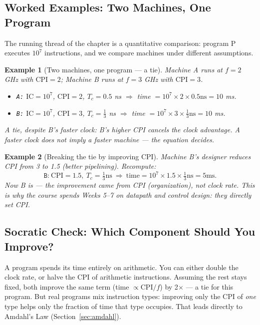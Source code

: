\documentclass[11pt]{article}
\newtheorem{example}{Example}[section]
\begin{document}
\subsection{Worked Examples: Two Machines, One Program}

The running thread of the chapter is a quantitative comparison: program P executes $10^7$ instructions, and we compare machines under different assumptions.

\begin{example}[Two machines, one program --- a tie]
Machine A runs at $f = 2$ GHz with $\text{CPI} = 2$; Machine B runs at $f = 3$ GHz with $\text{CPI} = 3$.
\begin{itemize}
  \item \texttt{A:} $\text{IC}=10^7$, $\text{CPI}=2$, $T_c = 0.5$ ns $\Rightarrow$ time $= 10^7 \times 2 \times 0.5\text{ns} = 10$ ms.
  \item \texttt{B:} $\text{IC}=10^7$, $\text{CPI}=3$, $T_c = \tfrac{1}{3}$ ns $\Rightarrow$ time $= 10^7 \times 3 \times \tfrac{1}{3}\text{ns} = 10$ ms.
\end{itemize}
A tie, despite B's faster clock: B's higher CPI cancels the clock advantage. A faster clock does not imply a faster machine --- the equation decides.
\end{example}

\begin{example}[Breaking the tie by improving CPI]
Machine B's designer reduces CPI from 3 to 1.5 (better pipelining). Recompute:
\[
  \texttt{B:}\ \text{CPI}=1.5,\ T_c=\tfrac{1}{3}\text{ns}\ \Rightarrow\ \text{time}
  = 10^7 \times 1.5 \times \tfrac{1}{3}\text{ns} = 5\text{ms}.
\]
Now B is  --- the improvement came from CPI (organization), not clock rate. This is why the course spends Weeks 5--7 on datapath and control design: they directly set CPI.
\end{example}

\subsection{Socratic Check: Which Component Should You Improve?}

A program spends its time entirely on arithmetic. You can either double the clock rate, or halve the CPI of arithmetic instructions. Assuming the rest stays fixed, both improve the same term (time $\propto \text{CPI}/f$) by 2$\times$ --- a tie for this program. But real programs mix instruction types: improving only the CPI of \emph{one} type helps only the fraction of time that type occupies. That leads directly to Amdahl's Law (Section~\ref{sec:amdahl}).
\end{document}
